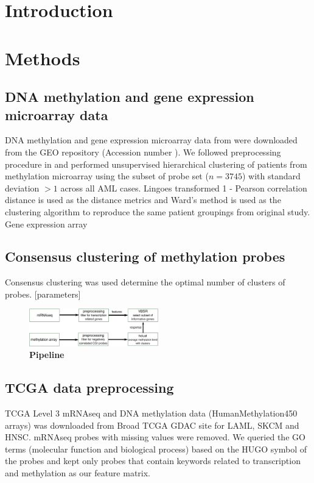 \documentclass{article}
\begin{document}
\section{Introduction}



\section{Methods}

\subsection{\citet{figueroa2010dna} DNA methylation and gene expression microarray data }

DNA methylation and gene expression microarray data from \citet{figueroa2010dna} were downloaded from the GEO repository (Accession number ). We followed preprocessing procedure in \citet{figueroa2010dna} and performed unsupervised hierarchical clustering of patients from methylation microarray using the subset of probe set ($n = 3745$) with standard deviation $> 1$ across all AML cases. Lingoes transformed 1 - Pearson correlation distance is used as the distance metrics and Ward's method is used as the clustering algorithm to reproduce the same patient groupings from original study. Gene expression array \citep{precog...}

\subsection{Consensus clustering of methylation probes}

Consensus clustering \citep{monti2003consensus, wilkerson2010consensusclusterplus} was used determine the optimal number of clusters of probes. [parameters]

\begin{figure}[h]
\includegraphics[width=0.5\textwidth]{../figs/flowChart}
\caption{\textbf{Pipeline}}
\end{figure}


\subsection{TCGA data preprocessing}
TCGA Level 3 mRNAseq and DNA methylation data (HumanMethylation450 arrays) was downloaded from Broad TCGA GDAC site for LAML, SKCM and HNSC. mRNAseq probes with missing values were removed. We queried the GO terms (molecular function and biological process) based on the HUGO symbol of the probes and kept only probes that contain keywords related to transcription and methylation as our feature matrix.   
\end{document}
